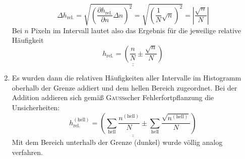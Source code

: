 \documentclass[german,  %
parskip=full,  %
]{scrartcl}
\begin{document}
\begin{enumerate}
\[\Delta h_{\mathrm{rel.}} = \sqrt{\left(\frac{\partial h_{\mathrm{rel.}}}{\partial n} \Delta n \right)^2} = \sqrt{\left(\frac{1}{N}\sqrt{n}\right)^2} = \left|\frac{\sqrt{n}}{N}\right|\]
Bei \(n\) Pixeln im Intervall lautet also das Ergebnis für die jeweilige relative Häufigkeit
\[\underline{\underline{h_{\mathrm{rel.}} = \left(\frac{n}{N} \pm \frac{\sqrt{n}}{N} \right)}}\]
\item Es wurden dann die relativen Häufigkeiten aller Intervalle im Histogramm oberhalb der Grenze addiert und dem hellen Bereich zugeordnet. Bei der Addition addieren sich gemäß \textsc{Gauß}scher Fehlerfortpflanzung die Unsicherheiten:
\[\underline{\underline{h_{\mathrm{rel.}}^{\mathrm{(hell)}} = \left(\sum_{\mathrm{hell}}\frac{n^{\mathrm{(hell)}}}{N} \pm \sum_{\mathrm{hell}}\frac{\sqrt{n^{\mathrm{(hell)}}}}{N} \right)}}\]
Mit dem Bereich unterhalb der Grenze (dunkel) wurde völlig analog verfahren. 
\end{enumerate}
\end{document}
